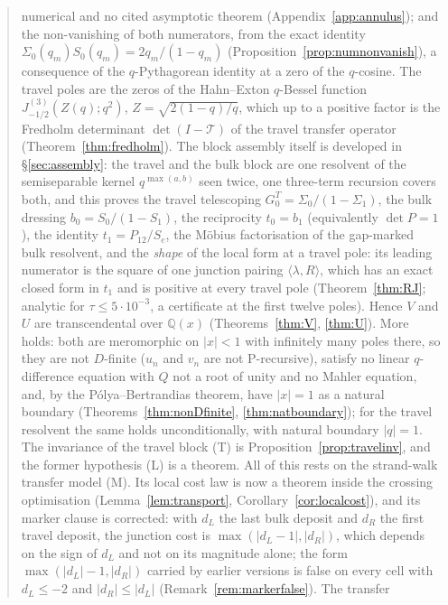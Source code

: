 \documentclass[11pt]{article}
\theoremstyle{plain}
\theoremstyle{definition}
\theoremstyle{remark}
\newcommand{\Q}{\mathbb{Q}}
\begin{document}
\begin{abstract}
\begin{enumerate}[leftmargin=1.9em,itemsep=0.12em,topsep=0.25em]
numerical and no cited asymptotic theorem (Appendix~\ref{app:annulus}); and the non-vanishing of
both numerators, from the exact identity $\Sigma_0(q_m)S_0(q_m)=2q_m/(1-q_m)$
(Proposition~\ref{prop:numnonvanish}), a consequence of the $q$-Pythagorean identity at a zero of
the $q$-cosine. The travel poles are the zeros of the Hahn--Exton $q$-Bessel function
$J^{(3)}_{-1/2}(Z(q);q^2)$, $Z=\sqrt{2(1-q)/q}$, which up to a positive factor is the Fredholm
determinant $\det(I-\mathcal T)$ of the travel transfer operator (Theorem~\ref{thm:fredholm}). The block assembly itself is developed in \S\ref{sec:assembly}: the travel and the
bulk block are one resolvent of the semiseparable kernel $q^{\max(a,b)}$ seen twice, one
three-term recursion covers both, and this proves the travel telescoping
$G^T_0=\Sigma_0/(1-\Sigma_1)$, the bulk dressing $b_0=S_0/(1-S_1)$, the reciprocity $t_0=b_1$
(equivalently $\det P=1$), the identity $t_1=P_{12}/S_e$, the M\"obius factorisation of the
gap-marked bulk resolvent, and the \emph{shape} of the local form at a travel pole: its leading
numerator is the square of one junction pairing $\langle\lambda,R\rangle$, which has an exact closed
form in $t_1$ and is positive at every travel pole (Theorem~\ref{thm:RJ}; analytic for
$\tau\le5\cdot10^{-3}$, a certificate at the first twelve poles). Hence $V$ and $U$ are
transcendental over $\Q(x)$ (Theorems~\ref{thm:V}, \ref{thm:U}). More holds: both are meromorphic on
$|x|<1$ with infinitely many poles there, so they are not $D$-finite ($u_n$ and $v_n$ are not
P-recursive), satisfy no linear $q$-difference equation with $Q$ not a root of unity and no Mahler
equation, and, by the P\'olya--Bertrandias theorem, have $|x|=1$ as a natural boundary
(Theorems~\ref{thm:nonDfinite}, \ref{thm:natboundary}); for the travel resolvent the same holds
unconditionally, with natural boundary $|q|=1$. The invariance of the travel block
\textup{(T)} is Proposition~\ref{prop:travelinv}, and the former hypothesis \textup{(L)} is a
theorem. All of this rests on the
strand-walk transfer model \textup{(M)}. Its local cost law is now a theorem inside the crossing
optimisation \textup{(}Lemma~\ref{lem:transport}, Corollary~\ref{cor:localcost}\textup{)}, and its
marker clause is corrected: with $d_L$ the last bulk deposit and $d_R$ the first travel deposit, the
junction cost is $\max(|d_L-1|,|d_R|)$, which depends on the sign of $d_L$ and not on its magnitude
alone; the form $\max(|d_L|-1,|d_R|)$ carried by earlier versions is false on every cell with
$d_L\le-2$ and $|d_R|\le|d_L|$ \textup{(}Remark~\ref{rem:markerfalse}\textup{)}. The transfer

\end{enumerate}
\end{abstract}
\end{document}
